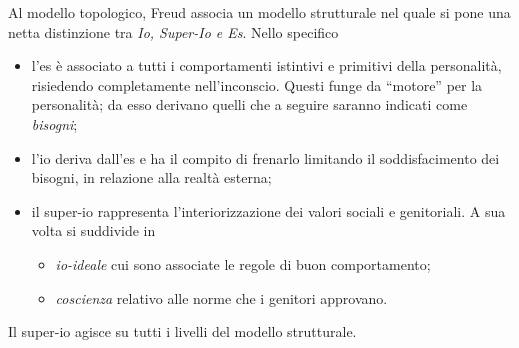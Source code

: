 \documentclass{subfiles}
\begin{document}
Al modello topologico, Freud associa un modello strutturale nel quale si pone una netta distinzione tra \emph{Io, Super-Io \emph{e} Es}.
Nello specifico
\begin{itemize}
    \item l'es è associato a tutti i comportamenti istintivi e primitivi della personalità,
          risiedendo completamente nell'inconscio. Questi funge da ``motore'' per la personalità;
          da esso derivano quelli che a seguire saranno indicati come \emph{bisogni};

    \item l'io deriva dall'es e ha il compito di frenarlo limitando il soddisfacimento dei bisogni, in relazione alla realtà esterna;

    \item il super-io rappresenta l'interiorizzazione dei valori sociali e genitoriali.
          A sua volta si suddivide in
          \begin{itemize}
              \item \emph{io-ideale} cui sono associate le regole di buon comportamento;
              \item \emph{coscienza} relativo alle norme che i genitori approvano.
          \end{itemize}
\end{itemize}
\begin{Remark*}
    Il super-io agisce su tutti i livelli del modello strutturale.
\end{Remark*}
\end{document}

